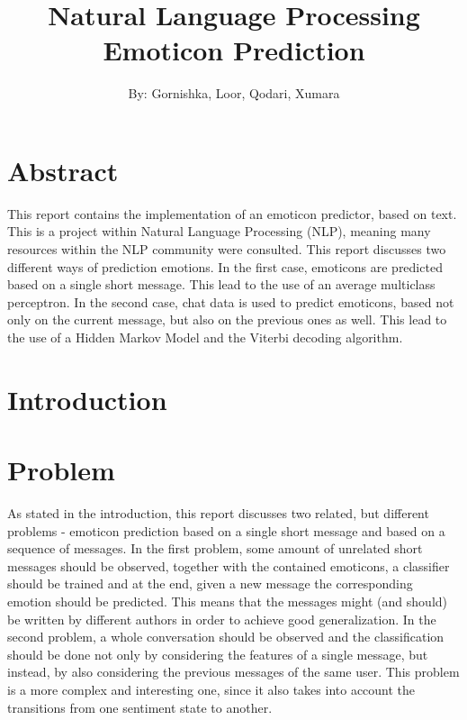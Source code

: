 \documentclass{article}
\begin{document}
\title{Natural Language Processing \\ Emoticon Prediction}

\author{By: Gornishka, Loor, Qodari, Xumara}
\maketitle


\tableofcontents

\pagebreak




\section{Abstract}

This report contains the implementation of an emoticon predictor, based on text. This is a project within Natural Language Processing (NLP), meaning many resources within the NLP community were consulted. This report discusses two different ways of prediction emotions. In the first case, emoticons are predicted based on a single short message. This lead to the use of an average multiclass perceptron. In the second case, chat data is used to predict emoticons, based not only on the current message, but also on the previous ones as well. This lead to the use of a Hidden Markov Model and the Viterbi decoding algorithm.


\section{Introduction}



\section{Problem}

As stated in the introduction, this report discusses two related, but different problems - emoticon prediction based on a single short message and based on a sequence of messages. In the first problem, some amount of unrelated short messages should be observed, together with the contained emoticons, a classifier should be trained and at the end, given a new message the corresponding emotion should be predicted. This means that the messages might (and should) be written by different authors in order to achieve good generalization. In the second problem, a whole conversation should be observed and the classification should be done not only by considering the features of a single message, but instead, by also considering the previous messages of the same user. This problem is a more complex and interesting one, since it also takes into account the transitions from one sentiment state to another. \\
\end{document}
